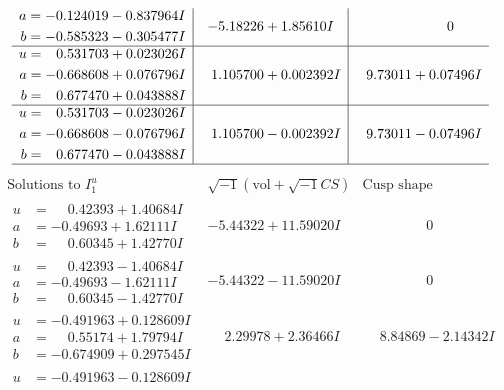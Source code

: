\documentclass[1p]{elsarticle_modified}
\theoremstyle{definition}
\newcommand{\I}{\sqrt{-1}}
\begin{document}
$$\begin{array}{c|c|c}
\begin{aligned}
a &= -0.124019 - 0.837964 I \\
b &= -0.585323 - 0.305477 I\end{aligned}
 & -5.18226 + 1.85610 I & \phantom{-0.000000 } 0 \\ \hline\begin{aligned}
u &= \phantom{-}0.531703 + 0.023026 I \\
a &= -0.668608 + 0.076796 I \\
b &= \phantom{-}0.677470 + 0.043888 I\end{aligned}
 & \phantom{-}1.105700 + 0.002392 I & \phantom{-}9.73011 + 0.07496 I \\ \hline\begin{aligned}
u &= \phantom{-}0.531703 - 0.023026 I \\
a &= -0.668608 - 0.076796 I \\
b &= \phantom{-}0.677470 - 0.043888 I\end{aligned}
 & \phantom{-}1.105700 - 0.002392 I & \phantom{-}9.73011 - 0.07496 I\\
 \hline 
 \end{array}$$\newpage$$\begin{array}{c|c|c}  
\text{Solutions to }I^u_{1}& \I (\text{vol} + \sqrt{-1}CS) & \text{Cusp shape}\\
 \hline 
\begin{aligned}
u &= \phantom{-}0.42393 + 1.40684 I \\
a &= -0.49693 + 1.62111 I \\
b &= \phantom{-}0.60345 + 1.42770 I\end{aligned}
 & -5.44322 + 11.59020 I & \phantom{-0.000000 } 0 \\ \hline\begin{aligned}
u &= \phantom{-}0.42393 - 1.40684 I \\
a &= -0.49693 - 1.62111 I \\
b &= \phantom{-}0.60345 - 1.42770 I\end{aligned}
 & -5.44322 - 11.59020 I & \phantom{-0.000000 } 0 \\ \hline\begin{aligned}
u &= -0.491963 + 0.128609 I \\
a &= \phantom{-}0.55174 + 1.79794 I \\
b &= -0.674909 + 0.297545 I\end{aligned}
 & \phantom{-}2.29978 + 2.36466 I & \phantom{-}8.84869 - 2.14342 I \\ \hline\begin{aligned}
u &= -0.491963 - 0.128609 I \\

\end{aligned}
\end{array}$$
\end{document}
